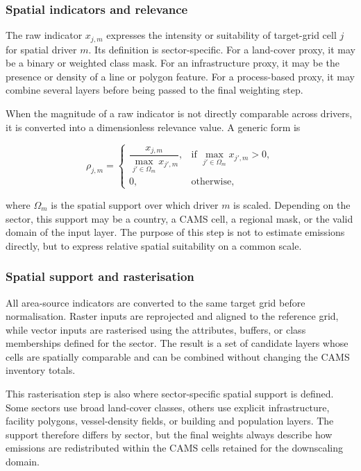 \subsubsection{Spatial indicators and relevance}
\label{sec:relevance-rho}

The raw indicator $x_{j,m}$ expresses the intensity or suitability of
target-grid cell $j$ for spatial driver $m$. Its definition is
sector-specific. For a land-cover proxy, it may be a binary or weighted
class mask. For an infrastructure proxy, it may be the presence or
density of a line or polygon feature. For a process-based proxy, it may
combine several layers before being passed to the final weighting step.

When the magnitude of a raw indicator is not directly comparable across
drivers, it is converted into a dimensionless relevance value. A generic
form is

\begin{equation}
\label{eq:rho-def}
  \rho_{j,m} =
  \begin{cases}
    \dfrac{x_{j,m}}{\displaystyle\max_{j' \in \Omega_m} x_{j',m}},
    & \text{if } \displaystyle\max_{j' \in \Omega_m} x_{j',m} > 0, \\
    0,
    & \text{otherwise,}
  \end{cases}
\end{equation}

where $\Omega_m$ is the spatial support over which driver $m$ is scaled.
Depending on the sector, this support may be a country, a CAMS cell, a
regional mask, or the valid domain of the input layer. The purpose of
this step is not to estimate emissions directly, but to express relative
spatial suitability on a common scale.

\subsubsection{Spatial support and rasterisation}
\label{sec:class-extent}

All area-source indicators are converted to the same target grid before
normalisation. Raster inputs are reprojected and aligned to the
reference grid, while vector inputs are rasterised using the attributes,
buffers, or class memberships defined for the sector. The result is a
set of candidate layers whose cells are spatially comparable and can be
combined without changing the CAMS inventory totals.

This rasterisation step is also where sector-specific spatial support is
defined. Some sectors use broad land-cover classes, others use explicit
infrastructure, facility polygons, vessel-density fields, or building
and population layers. The support therefore differs by sector, but the
final weights always describe how emissions are redistributed within the
CAMS cells retained for the downscaling domain.

